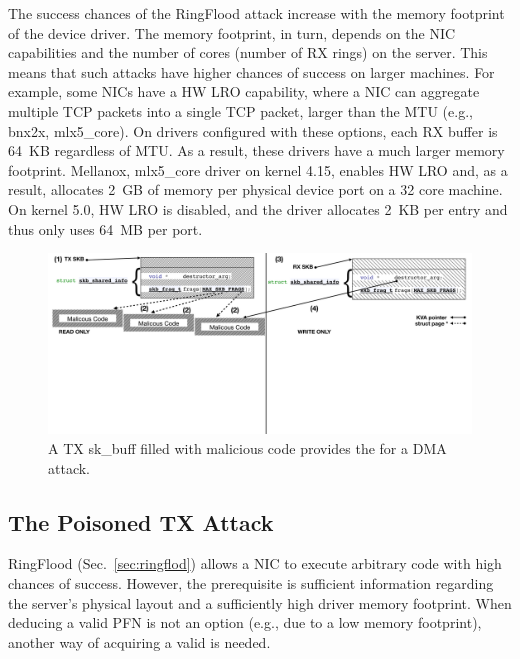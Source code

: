 The success chances of the RingFlood attack increase with the memory footprint of the device driver. The memory footprint, in turn, depends on the NIC capabilities and the number of cores (number of RX rings) on the server. This means that such attacks have higher chances of success on larger machines. 
For example, some NICs have a HW LRO capability\cite{mlx5_lro}, where a NIC can aggregate multiple TCP packets into a single TCP packet, larger than the MTU (e.g., bnx2x, mlx5\_core). On drivers configured with these options, each RX buffer is 64~KB regardless of MTU. As a result, these drivers have a much larger memory footprint. Mellanox, mlx5\_core driver on kernel 4.15, enables HW LRO and, as a result, allocates 2~GB of memory per physical device port on a 32 core machine. On kernel 5.0, HW LRO is disabled, and the driver allocates 2~KB per entry and thus only uses 64~MB per port.

\begin{figure}[t]
    \centering
    \includegraphics[width=0.8\linewidth]{figs/accomplice.pdf}
    \caption{A TX sk\_buff filled with malicious code provides the \kva for a DMA attack.}
    \label{fig:payload}
\end{figure}
\subsection{The Poisoned TX \Compound{} Attack}\label{sec:posion}

RingFlood (Sec.~\ref{sec:ringflod}) allows a NIC to execute arbitrary code with high chances of success. However, the prerequisite is sufficient information regarding the server's physical layout and a sufficiently high driver memory footprint. When deducing a valid PFN is not an option (e.g., due to a low memory footprint), another way of acquiring a valid \kva{} is needed.

